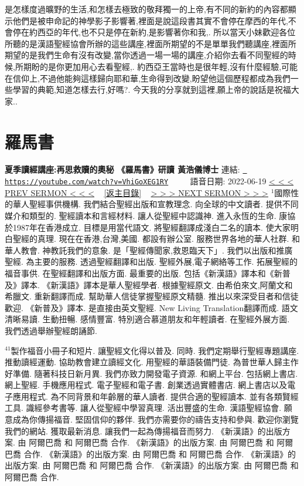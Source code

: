 \documentclass{book}
\begin{document}
是怎樣度過曠野的生活,和怎樣去極致的敬拜獨一的上帝,有不同的新約的內容都顯示他們是被申命記的神學影子影響著,裡面是說這段書其實不會停在摩西的年代,不會停在約西亞的年代,也不只是停在新約,是影響著你和我,.
所以當天小妹歡迎各位所聽的是漢語聖經協會所辦的這些講座,裡面所期望的不是單單我們聽講座,裡面所期望的是我們生命有沒有改變,當你透過一場一場的講座,介紹你去看不同聖經的時候,所期盼的是你更加用心去看聖經,.
約西亞王當時也是很年輕,沒有什麼經驗,可能在信仰上,不過他能夠這樣歸向耶和華,生命得到改變,盼望他這個歷程都成為我們一些學習的典範,知道怎樣去行,好嗎?.
今天我的分享就到這裡,願上帝的說話是祝福大家..
\newpage



\section{羅馬書}
\label{sec:VhiGoXEG1RY}
\textbf{夏季讀經講座:再思救贖的奧秘 《羅馬書》研讀 黃浩儀博士}
\newline
\newline
連結: \href{https://youtube.com/watch?v=VhiGoXEG1RY}{\texttt{ https://youtube.com/watch?v=VhiGoXEG1RY}} ~~~~ 語音日期: 2022-06-19 
\newline
\newline
\hyperref[sec:0UjUn93f77k]{\small{< < < PREV SERMON < < <}}
~
\hyperref[sec:index]{\small{[返主目錄]}}
~
\hyperref[sec:A_3yEYQkm9Y]{\small{> > > NEXT SERMON > > >}}
\newline
\newline
$^{1}$國際性的華人聖經事供機構.
我們結合聖經出版和宣教理念.
向全球的中文讀者.
提供不同媒介和類型的.
聖經讀本和言經材料.
讓人從聖經中認識神.
進入永恆的生命.
康協於1987年在香港成立.
目標是用當代語文.
將聖經翻譯成淺白二名的讀本.
使大家明白聖經的真理.
現在在香港,台灣,美國.
都設有辦公室.
服務世界各地的華人社群.
和華人教會.
神教託我們的意象.
是「聖經傳聞家,救恩臨天下」.
我們以出版和推廣聖經.
為主要的服務.
透過聖經翻譯和出版.
聖經外展,電子網絡等工作.
拓展聖經的福音事供.
在聖經翻譯和出版方面.
最重要的出版.
包括《新漢語》譯本和《新普及》譯本.
《新漢語》譯本是華人聖經學者.
根據聖經原文.
由希伯來文,阿蘭文和希臘文.
重新翻譯而成.
幫助華人信徒掌握聖經原文精髓.
推出以來深受目者和信徒歡迎.
《新普及》譯本.
是直接由英文聖經.
New Living Translation翻譯而成.
語文清晰易讀.
生動扭暢.
感情豐富.
特別適合慕道朋友和年輕讀者.
在聖經外展方面.
我們透過舉辦聖經朗誦節.

$^{41}$製作福音小冊子和短片.
讓聖經文化得以普及.
同時.
我們定期舉行聖經專題講座.
推動讀經運動.
協助教會建立讀經文化.
用聖經的華語裝備門徒.
為普世華人歸主作好準備.
隨著科技日新月異.
我們亦致力開發電子資源.
和網上平台.
包括網上書店.
網上聖經.
手機應用程式.
電子聖經和電子書.
創業透過實體書店.
網上書店以及電子應用程式.
為不同背景和年齡層的華人讀者.
提供合適的聖經讀本.
並有各類賢經工具.
識經參考書等.
讓人從聖經中學習真理.
活出豐盛的生命.
漢語聖經協會.
願意成為你傳揚福音.
堅固信仰的夥伴.
我們亦需要你的禱告支持和參與.
歡迎你瀏覽我們的網站.
獲取最新消息.
讓我們一起為傳揚福音而努力.
《新漢語》的出版方案.
由 阿爾巴喬 和 阿爾巴喬 合作.
《新漢語》的出版方案.
由 阿爾巴喬 和 阿爾巴喬 合作.
《新漢語》的出版方案.
由 阿爾巴喬 和 阿爾巴喬 合作.
《新漢語》的出版方案.
由 阿爾巴喬 和 阿爾巴喬 合作.
《新漢語》的出版方案.
由 阿爾巴喬 和 阿爾巴喬 合作.
\end{document}
